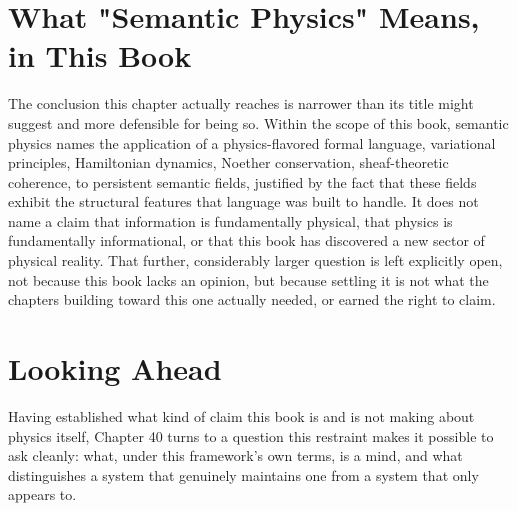 \section{What "Semantic Physics" Means, in This Book}

The conclusion this chapter actually reaches is narrower than its title might suggest and more defensible for being so. Within the scope of this book, semantic physics names the application of a physics-flavored formal language, variational principles, Hamiltonian dynamics, Noether conservation, sheaf-theoretic coherence, to persistent semantic fields, justified by the fact that these fields exhibit the structural features that language was built to handle. It does not name a claim that information is fundamentally physical, that physics is fundamentally informational, or that this book has discovered a new sector of physical reality. That further, considerably larger question is left explicitly open, not because this book lacks an opinion, but because settling it is not what the chapters building toward this one actually needed, or earned the right to claim.

\section{Looking Ahead}

Having established what kind of claim this book is and is not making about physics itself, Chapter 40 turns to a question this restraint makes it possible to ask cleanly: what, under this framework's own terms, is a mind, and what distinguishes a system that genuinely maintains one from a system that only appears to.
